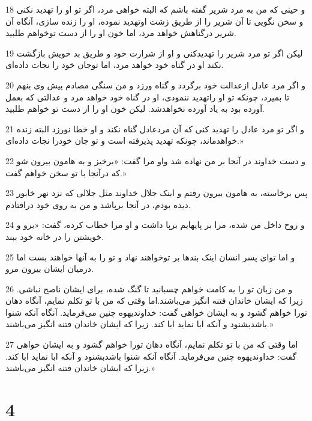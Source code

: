 \par 18 و حینی که من به مرد شریر گفته باشم که البته خواهی مرد، اگر تو او را تهدید نکنی و سخن نگویی تا آن شریر را از طریق زشت اوتهدید نموده، او را زنده سازی، آنگاه آن شریر درگناهش خواهد مرد، اما خون او را از دست توخواهم طلبید.
\par 19 لیکن اگر تو مرد شریر را تهدیدکنی و او از شرارت خود و طریق بد خویش بازگشت نکند او در گناه خود خواهد مرد، اما توجان خود را نجات داده‌ای.
\par 20 و اگر مرد عادل ازعدالت خود برگردد و گناه ورزد و من سنگی مصادم پیش وی بنهم تا بمیرد، چونکه تو او راتهدید ننمودی، او در گناه خود خواهد مرد و عدالتی که بعمل آورده بود به یاد آورده نخواهدشد. لیکن خون او را از دست تو خواهم طلبید.
\par 21 و اگر تو مرد عادل را تهدید کنی که آن مردعادل گناه نکند و او خطا نورزد البته زنده خواهدماند، چونکه تهدید پذیرفته است و تو جان خودرا نجات داده‌ای.»
\par 22 و دست خداوند در آنجا بر من نهاده شد واو مرا گفت: «برخیز و به هامون بیرون شو که درآنجا با تو سخن خواهم گفت.»
\par 23 پس برخاسته، به هامون بیرون رفتم و اینک جلال خداوند مثل جلالی که نزد نهر خابور دیده بودم، در آنجا برپاشد و من به روی خود درافتادم.
\par 24 و روح داخل من شده، مرا بر پایهایم برپا داشت و او مرا خطاب کرده، گفت: «برو و خویشتن را در خانه خود ببند.
\par 25 و اما تو‌ای پسر انسان اینک بندها بر توخواهند نهاد و تو را به آنها خواهند بست اما درمیان ایشان بیرون مرو.
\par 26 و من زبان تو را به کامت خواهم چسبانید تا گنگ شده، برای ایشان ناصح نباشی. زیرا که ایشان خاندان فتنه انگیز می‌باشند.اما وقتی که من با تو تکلم نمایم، آنگاه دهان تورا خواهم گشود و به ایشان خواهی گفت: خداوندیهوه چنین می‌فرماید. آنگاه آنکه شنوا باشدبشنود و آنکه ابا نماید ابا کند. زیرا که ایشان خاندان فتنه انگیز می‌باشند.»
\par 27 اما وقتی که من با تو تکلم نمایم، آنگاه دهان تورا خواهم گشود و به ایشان خواهی گفت: خداوندیهوه چنین می‌فرماید. آنگاه آنکه شنوا باشدبشنود و آنکه ابا نماید ابا کند. زیرا که ایشان خاندان فتنه انگیز می‌باشند.»

\chapter{4}

